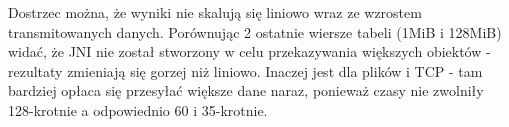 Dostrzec można, że wyniki nie skalują się liniowo wraz ze wzrostem transmitowanych danych. Porównując 2 ostatnie wiersze tabeli (1MiB i 128MiB) widać, że JNI nie został stworzony w celu przekazywania większych obiektów - rezultaty zmieniają się gorzej niż liniowo. Inaczej jest dla plików i TCP - tam bardziej opłaca się przesyłać większe dane naraz, ponieważ czasy nie zwolniły 128-krotnie a odpowiednio 60 i 35-krotnie.
